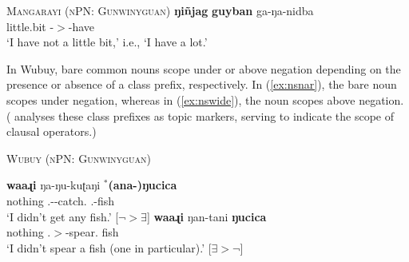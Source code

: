 \documentclass[12pt,egregdoesnotlikesansseriftitles]{scrartcl}
\begin{document}
\begin{exe}
  \ex \textsc{Mangarayi (nPN: Gunwinyguan)} \hfill {} \label{mangarayiquantneg1}
  \gll \textbf{ŋi\~{n}jag} \textbf{guyban} ga-ŋa-nidba\\
  \Proh{} little.bit \Third-\Fsg$>$\Tsg-have\\
  \glt `I have not a little bit,' i.e., `I have a lot.' %
\end{exe}

In Wubuy, bare common nouns scope under or above negation depending on the presence or absence of a class prefix, respectively. In (\ref{ex:nsnar}), the bare noun scopes under negation, whereas in (\ref{ex:nswide}), the noun scopes above negation. (\cite{baker08} analyses these class prefixes as topic markers, serving to indicate the scope of clausal operators.)
\begin{exe}
  \ex\label{ex:nuyscope} \textsc{Wubuy (nPN: Gunwinyguan)}\hfill {}
  \begin{xlist}
    \ex\label{ex:nsnar}\gll \textbf{waaɻi} ŋa-ŋu-kuʈaŋi $^*$\textbf{(ana-)ŋucica}\\
    nothing \Fsg.\Sarg-\Clneut-catch.\Pcon{} \phantom{$^*$(}\Clneut.\Top-fish\\
    \glt `I didn't get any fish.' \hfill [$\neg > \exists$]
    \ex\label{ex:nswide}\gll \textbf{waaɻi} ŋan-tani \textbf{ŋucica}\\
    nothing \Fsg.\Sarg$>$\Anim-spear.\Pcon{} fish\\
    \glt `I didn't spear a fish (one in particular).' \hfill [$\exists > \neg$]
  \end{xlist}
\end{exe}
\end{document}
